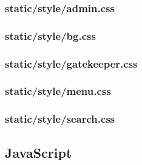 \documentclass{book}
\renewcommand{\,}{\kern0.2ex}
\begin{document}
	\subsubsection{static/style/admin.css}
	
	
	\subsubsection{static/style/bg.css}
	
	
	\subsubsection{static/style/gatekeeper.css}
	
	
	\subsubsection{static/style/menu.css}
	
	
	\subsubsection{static/style/search.css}
	
	
	
	\subsection{JavaScript}
	
	
	
	
	
	
\end{document}
